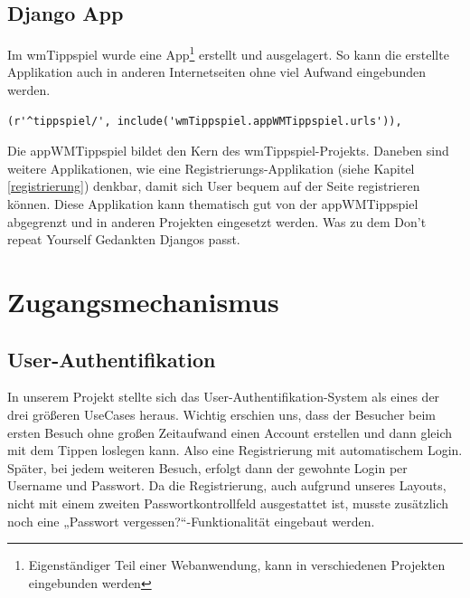 \section{Django App}
Im wmTippspiel wurde eine App\footnote{Eigenständiger Teil einer Webanwendung,
kann in verschiedenen Projekten eingebunden werden} erstellt und ausgelagert. So
kann die erstellte Applikation auch in anderen Internetseiten ohne viel Aufwand 
eingebunden werden.

\begin{lstlisting}
(r'^tippspiel/', include('wmTippspiel.appWMTippspiel.urls')),
\end{lstlisting}

Die appWMTippspiel bildet den Kern des wmTippspiel-Projekts. Daneben sind
weitere Applikationen, wie eine Registrierungs-Applikation
(siehe Kapitel \ref{registrierung}) denkbar, damit sich User bequem auf der
Seite registrieren können. Diese Applikation kann thematisch gut von der 
appWMTippspiel abgegrenzt und in anderen Projekten eingesetzt werden. Was zu
dem Don't repeat Yourself Gedankten Djangos passt.

\chapter{Zugangsmechanismus}
\section{User-Authentifikation}
In unserem Projekt stellte sich das User-Authentifikation-System als eines der
drei größeren UseCases heraus. Wichtig erschien uns, dass der Besucher beim 
ersten Besuch ohne großen Zeitaufwand einen Account erstellen und dann 
gleich mit dem Tippen loslegen kann. Also eine Registrierung mit automatischem 
Login. Später, bei jedem weiteren Besuch, erfolgt dann der gewohnte Login per 
Username und Passwort. Da die Registrierung, auch aufgrund unseres Layouts, 
nicht mit einem zweiten Passwortkontrollfeld ausgestattet ist, musste
zusätzlich noch eine „Passwort vergessen?“-Funktionalität eingebaut werden.

